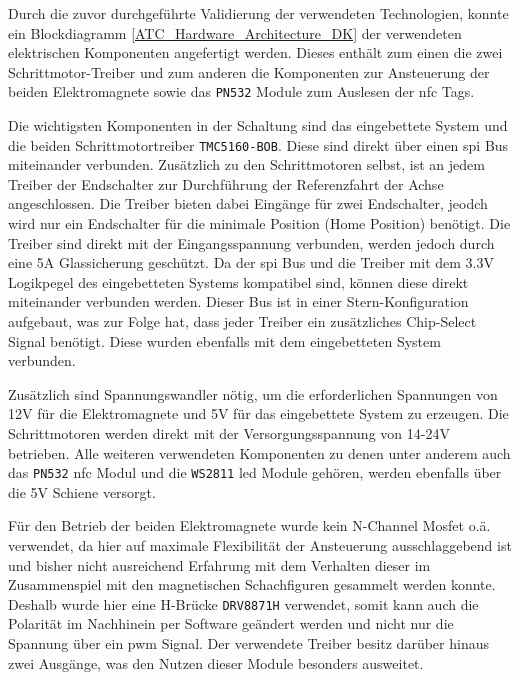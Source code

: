Durch die zuvor durchgeführte Validierung der verwendeten Technologien,
konnte ein Blockdiagramm \ref{ATC_Hardware_Architecture_DK} der
verwendeten elektrischen Komponenten angefertigt werden. Dieses enthält
zum einen die zwei Schrittmotor-Treiber und zum anderen die Komponenten
zur Ansteuerung der beiden Elektromagnete sowie das
\passthrough{\lstinline!PN532!} Module zum Auslesen der \gls{nfc} Tags.

Die wichtigsten Komponenten in der Schaltung sind das eingebettete
System und die beiden Schrittmotortreiber
\passthrough{\lstinline!TMC5160-BOB!}. Diese sind direkt über einen
\gls{spi} Bus miteinander verbunden. Zusätzlich zu den Schrittmotoren
selbst, ist an jedem Treiber der Endschalter zur Durchführung der
Referenzfahrt der Achse angeschlossen. Die Treiber bieten dabei Eingänge
für zwei Endschalter, jeodch wird nur ein Endschalter für die minimale
Position (Home Position) benötigt. Die Treiber sind direkt mit der
Eingangsspannung verbunden, werden jedoch durch eine 5A Glassicherung
geschützt. Da der \gls{spi} Bus und die Treiber mit dem 3.3V Logikpegel
des eingebetteten Systems kompatibel sind, können diese direkt
miteinander verbunden werden. Dieser Bus ist in einer
Stern-Konfiguration aufgebaut, was zur Folge hat, dass jeder Treiber ein
zusätzliches Chip-Select Signal benötigt. Diese wurden ebenfalls mit dem
eingebetteten System verbunden.

Zusätzlich sind Spannungswandler nötig, um die erforderlichen Spannungen
von 12V für die Elektromagnete und 5V für das eingebettete System zu
erzeugen. Die Schrittmotoren werden direkt mit der Versorgungsspannung
von 14-24V betrieben. Alle weiteren verwendeten Komponenten zu denen
unter anderem auch das \passthrough{\lstinline!PN532!} \gls{nfc} Modul
und die \passthrough{\lstinline!WS2811!} \gls{led} Module gehören,
werden ebenfalls über die 5V Schiene versorgt.

Für den Betrieb der beiden Elektromagnete wurde kein N-Channel Mosfet
o.ä. verwendet, da hier auf maximale Flexibilität der Ansteuerung
ausschlaggebend ist und bisher nicht ausreichend Erfahrung mit dem
Verhalten dieser im Zusammenspiel mit den magnetischen Schachfiguren
gesammelt werden konnte. Deshalb wurde hier eine H-Brücke
\passthrough{\lstinline!DRV8871H!} verwendet, somit kann auch die
Polarität im Nachhinein per Software geändert werden und nicht nur die
Spannung über ein \gls{pwm} Signal. Der verwendete Treiber besitz
darüber hinaus zwei Ausgänge, was den Nutzen dieser Module besonders
ausweitet.

